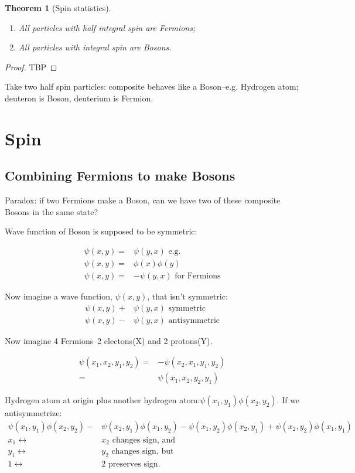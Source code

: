 \documentclass[]{article}
\newtheorem{thm}{Theorem}
\begin{document}
\begin{thm}[Spin statistics]
	\begin{enumerate}
		\item All particles with half integral spin are Fermions;
		\item All particles with  integral spin are Bosons.
	\end{enumerate}
\end{thm}

\begin{proof}
	TBP
\end{proof}
Take two half spin particles: composite behaves like a Boson--e.g. Hydrogen atom; deuteron is Boson, deuterium is Fermion.


\section{Spin}

\subsection{Combining Fermions to make Bosons}

Paradox: if two Fermions make a Boson, can we have two of these composite Bosons in the same state?

Wave function of Boson is supposed to be symmetric:

\begin{align*}
	\psi(x,y) =&\psi(y,x) \text{ e.g. }\\
	\psi(x,y) =& \phi(x)\phi(y)\\
	\psi(x,y) =&-\psi(y,x) \text{ for Fermions}
\end{align*}

Now imagine a wave function, $\psi(x,y)$, that isn't symmetric:
\begin{align*}
\psi(x,y)+& \psi(y,x) \text{ symmetric}\\
\psi(x,y)-& \psi(y,x) \text{ antisymmetric}
\end{align*}

Now imagine 4 Fermions--2 electons(X) and 2 protons(Y).

\begin{align*}
\psi(x_1,x_2,y_1,y_2) = &-\psi(x_2,x_1,y_1,y_2)\\
=& \psi(x_1,x_2,y_2,y_1)
\end{align*} 

Hydrogen atom at origin plus another hydrogen atom:$\psi(x_1,y_1) \phi(x_2,y_2)$.
If we antisymmetrize:
\begin{align*}
	\psi(x_1,y_1) \phi(x_2,y_2) -& \psi(x_2,y_1) \phi(x_1,y_2) 
	-\psi(x_1,y_2) \phi(x_2,y_1) + \psi(x_2,y_2) \phi(x_1,y_1)\\
	x_1 \leftrightarrow& x_2 \text{ changes sign, and}\\
	y_1 \leftrightarrow& y_2 \text{ changes sign, but}\\
	1 \leftrightarrow& 2 \text { preserves sign.}
\end{align*}
\end{document}
